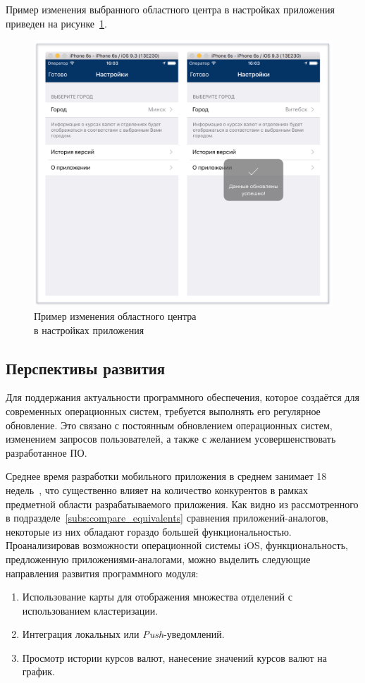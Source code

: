 Пример изменения выбранного областного центра в настройках приложения приведен
на рисунке~\ref{fig:settings_manual}.
\begin{figure}[h!]
  \centering
  \includegraphics[width=130mm]{fig/settings_manual}
  \caption{Пример изменения областного центра \\ в настройках приложения}
  \label{fig:settings_manual}
\end{figure}

\pagebreak



\subsection{Перспективы развития}

Для поддержания актуальности программного обеспечения, которое
создаётся для современных операционных систем, требуется выполнять его
регулярное обновление. Это связано с постоянным обновлением операционных систем,
изменением запросов пользователей, а также с желанием усовершенствовать
разработанное ПО.

Среднее время разработки мобильного приложения в среднем занимает 18
недель~\cite{time_to_develop_mobile_app}, что существенно влияет
на количество конкурентов в рамках предметной области разрабатываемого приложения.
Как видно из рассмотренного в подразделе~\ref{subs:compare_equivalents} сравнения приложений-аналогов,
некоторые из них обладают гораздо большей функциональностью. Проанализировав
возможности операционной системы iOS, функциональность, предложенную
приложениями-аналогами, можно выделить следующие направления развития
программного модуля:
\begin{enumerate}
  \item Использование карты для отображения множества отделений с использованием
    кластеризации.
  \item Интеграция локальных или \textit{Push}-уведомлений.
  \item Просмотр истории курсов валют, нанесение значений курсов валют на график.
\end{enumerate}

